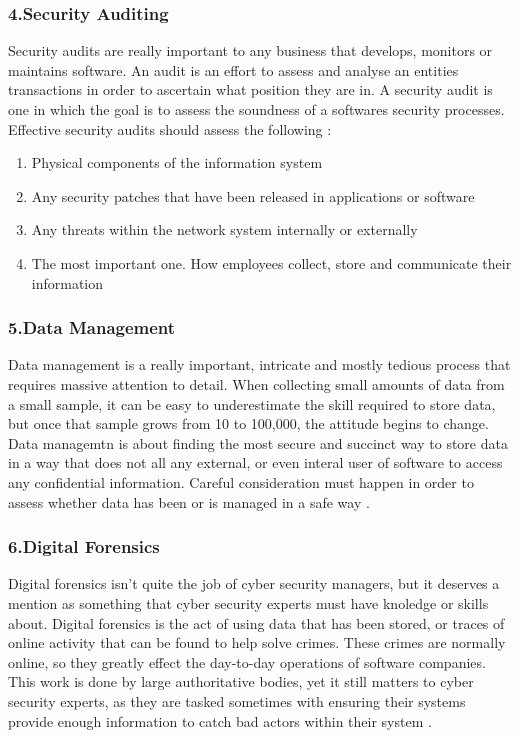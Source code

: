 \documentclass[a4paper, 11pt]{report}
\begin{document}
    \subsubsection{4.Security Auditing}
    Security audits are really important to any business that develops, monitors or maintains software. An audit is an effort to assess and analyse an entities transactions in order to ascertain what position they are in. A security audit is one in which the goal is to assess the soundness of a softwares security processes. Effective security audits should assess the following \cite{jake4}:
    \begin{enumerate}
        \item Physical components of the information system
        \item Any security patches that have been released in applications or software
        \item Any threats within the network system internally or externally
        \item The most important one. How employees collect, store and communicate their information
    \end{enumerate}
    \subsubsection{5.Data Management}
    Data management is a really important, intricate and mostly tedious process that requires massive attention to detail. When collecting small amounts of data from a small sample, it can be easy to underestimate the skill required to store data, but once that sample grows from 10 to 100,000, the attitude begins to change. Data managemtn is about finding the most secure and succinct way to store data in a way that does not all any external, or even interal user of software to access any confidential information. Careful consideration must happen in order to assess whether data has been or is managed in a safe way \cite{jake5}.
    \subsubsection{6.Digital Forensics}
    Digital forensics isn't quite the job of cyber security managers, but it deserves a mention as something that cyber security experts must have knoledge or skills about. Digital forensics is the act of using data that has been stored, or traces of online activity that can be found to help solve crimes. These crimes are normally online, so they greatly effect the day-to-day operations of software companies. This work is done by large authoritative bodies, yet it still matters to cyber security experts, as they are tasked sometimes with ensuring their systems provide enough information to catch bad actors within their system \cite{jake6}.
\end{document}
